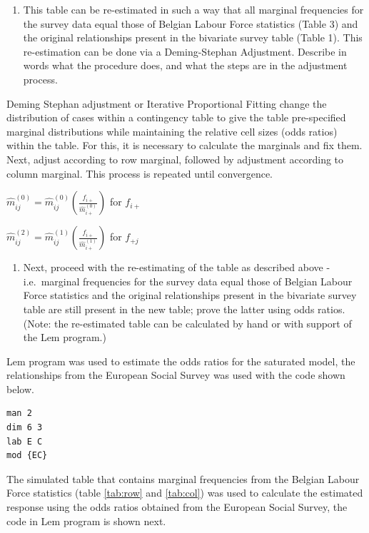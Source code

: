 \documentclass[
  12pt,
]{article}
\providecommand{\tightlist}{%
  \setlength{\itemsep}{0pt}\setlength{\parskip}{0pt}}
\begin{document}
\begin{enumerate}
\def\labelenumi{\alph{enumi}.}
\tightlist
\item
  This table can be re-estimated in such a way that all marginal frequencies for the survey data equal those of Belgian Labour Force statistics (Table 3) and the original relationships present in the bivariate survey table (Table 1). This re-estimation can be done via a Deming-Stephan Adjustment. Describe in words what the procedure does, and what the steps are in the adjustment process.
\end{enumerate}

Deming Stephan adjustment or Iterative Proportional Fitting change the distribution of cases within a contingency table to give the table pre-specified marginal distributions while maintaining the relative cell sizes (odds ratios) within the table. For this, it is necessary to calculate the marginals and fix them. Next, adjust according to row marginal, followed by adjustment according to column marginal. This process is repeated until convergence.

\(\hat m_{ij}^{(0)}=\hat m_{ij}^{(0)}(\frac{f_{i+}}{\hat m_{i+}^{(0)}})\) for \(f_{i+}\)

\(\hat m_{ij}^{(2)}=\hat m_{ij}^{(1)}(\frac{f_{i+}}{\hat m_{i+}^{(1)}})\) for \(f_{+j}\)

\begin{enumerate}
\def\labelenumi{\alph{enumi}.}
\setcounter{enumi}{1}
\tightlist
\item
  Next, proceed with the re-estimating of the table as described above - i.e.~marginal frequencies for the survey data equal those of Belgian Labour Force statistics and the original relationships present in the bivariate survey table are still present in the new table; prove the latter using odds ratios. (Note: the re-estimated table can be calculated by hand or with support of the Lem program.)
\end{enumerate}

Lem program was used to estimate the odds ratios for the saturated model, the relationships from the European Social Survey was used with the code shown below.

\begin{verbatim}
man 2
dim 6 3
lab E C
mod {EC}
\end{verbatim}

The simulated table that contains marginal frequencies from the Belgian Labour Force statistics (table \ref{tab:row} and \ref{tab:col}) was used to calculate the estimated response using the odds ratios obtained from the European Social Survey, the code in Lem program is shown next.
\end{document}
